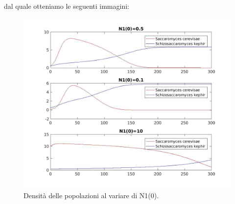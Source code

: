 \documentclass[11pt,a4paper,twoside,openright,titlepage,
headinclude,footinclude,BCOR5mm,
numbers=noenddot,cleardoublepage=empty,
tablecaptionabove]{scrbook}
\begin{document}
dal quale otteniamo le seguenti immagini:
\begin{center}
\begin{figure}[h!]
\includegraphics[width=\textwidth]{figs/diegomyces.jpg}
\caption{Densità delle popolazioni al variare di N1(0).}
\end{figure}
\end{center}
\end{document}
